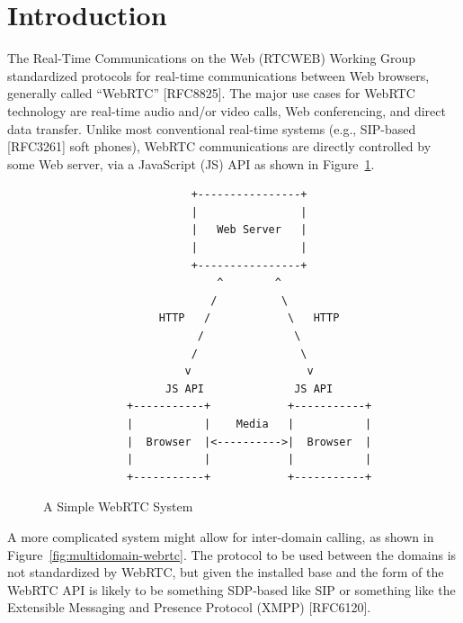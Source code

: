 \documentclass{article}
\begin{document}
\tableofcontents

\section{Introduction}

The Real-Time Communications on the Web (RTCWEB) Working Group
standardized protocols for real-time communications between Web
browsers, generally called ``WebRTC'' [RFC8825].  The major use cases
for WebRTC technology are real-time audio and/or video calls, Web
conferencing, and direct data transfer.  Unlike most conventional
real-time systems (e.g., SIP-based [RFC3261] soft phones), WebRTC
communications are directly controlled by some Web server, via a
JavaScript (JS) API as shown in Figure~\ref{fig:simple-webrtc}.

\begin{figure}[ht]
\begin{verbatim}
                       +----------------+
                       |                |
                       |   Web Server   |
                       |                |
                       +----------------+
                           ^        ^
                          /          \
                  HTTP   /            \   HTTP
                        /              \
                       /                \
                      v                  v
                   JS API              JS API
             +-----------+            +-----------+
             |           |    Media   |           |
             |  Browser  |<---------->|  Browser  |
             |           |            |           |
             +-----------+            +-----------+
\end{verbatim}
\caption{A Simple WebRTC System}
\label{fig:simple-webrtc}
\end{figure}

A more complicated system might allow for inter-domain calling, as
shown in Figure~\ref{fig:multidomain-webrtc}.  The protocol to be used between the domains is
not standardized by WebRTC, but given the installed base and the form
of the WebRTC API is likely to be something SDP-based like SIP or
something like the Extensible Messaging and Presence Protocol (XMPP)
[RFC6120].
\end{document}
